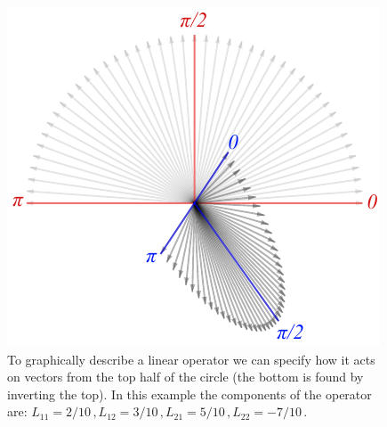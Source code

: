\begin{figure}[htbp]
  \centering
  \includegraphics[scale=1.0]{linearOperatorActionHalf}
  \caption{To graphically describe a linear operator we can specify
    how it acts on vectors from the top half of the circle (the bottom
    is found by inverting the top). In this
    example the components of the operator are:
    $L_{11}=2/10\,, L_{12}=3/10\,, L_{21}=5/10\,,L_{22}=-7/10\,.$}
  \label{fig:linearOperatorActionHalf}
\end{figure}
